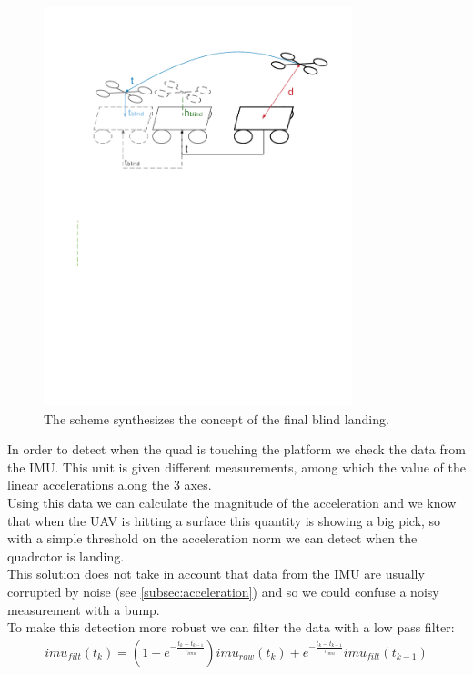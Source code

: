 \begin{figure}[!htbp]
    \centering
    \includegraphics[width=0.8\textwidth]{img/blind_landing.pdf}
    \caption{The scheme synthesizes the concept of the final blind landing. }
    \label{fig:align_platform}
\end{figure}

In order to detect when the quad is touching the platform we check the data from the IMU. This unit is given different measurements, among which the value of the linear accelerations along the 3 axes. \\
Using this data we can calculate the magnitude of the acceleration and we know that when the UAV is hitting a surface this quantity is showing a big pick, so with a simple threshold on the acceleration norm we can detect when the quadrotor is landing.\\
This solution does not take in account that data from the IMU are usually corrupted by noise (see \ref{subsec:acceleration}) and so we could confuse a noisy measurement with a bump. \\
To make this detection more robust we can filter the data with a low pass filter:
\begin{align}
imu_{filt}(t_k) =  (1-e^{-\frac{t_k-t_{k-1}}{\tau_{imu}}})imu_{raw}(t_k) + e^{-\frac{t_k-t_{k-1}}{\tau_{imu}}} imu_{filt}(t_{k-1})
\label{eq:imu_filtered}
\end{align} 

